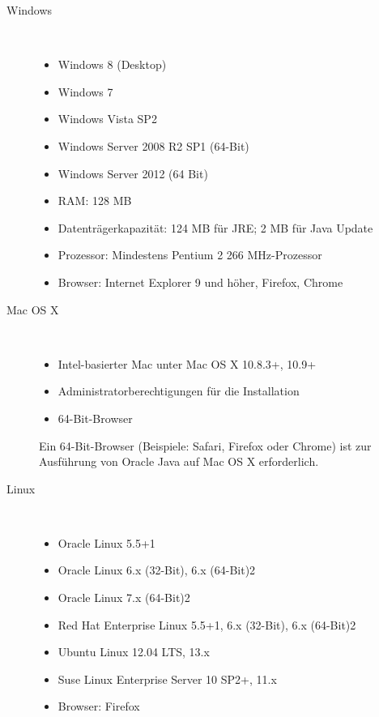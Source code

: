 \begin{description}
   \item[Windows]~\par
   \begin{itemize}

    \item Windows 8 (Desktop)
    \item Windows 7
    \item Windows Vista SP2
    \item Windows Server 2008 R2 SP1 (64-Bit)
    \item Windows Server 2012 (64 Bit)
    \item RAM: 128 MB
    \item Datenträgerkapazität: 124 MB für JRE; 2 MB für Java Update
    \item Prozessor: Mindestens Pentium 2 266 MHz-Prozessor
    \item Browser: Internet Explorer 9 und höher, Firefox, Chrome
   \end{itemize}
   
      \item[Mac OS X]~\par
      \begin{itemize}
    \item Intel-basierter Mac unter Mac OS X 10.8.3+, 10.9+
    \item Administratorberechtigungen für die Installation
    \item 64-Bit-Browser
      \end{itemize}
      
      Ein 64-Bit-Browser (Beispiele: Safari, Firefox oder Chrome) ist zur Ausführung von Oracle Java auf Mac OS X erforderlich.
      
   \item[Linux]~\par
   \begin{itemize}

    \item Oracle Linux 5.5+1
    \item Oracle Linux 6.x (32-Bit), 6.x (64-Bit)2
    \item Oracle Linux 7.x (64-Bit)2
    \item Red Hat Enterprise Linux 5.5+1, 6.x (32-Bit), 6.x (64-Bit)2
    \item Ubuntu Linux 12.04 LTS, 13.x
    \item Suse Linux Enterprise Server 10 SP2+, 11.x
    \item Browser: Firefox

   \end{itemize}
      
   
\end{description}


